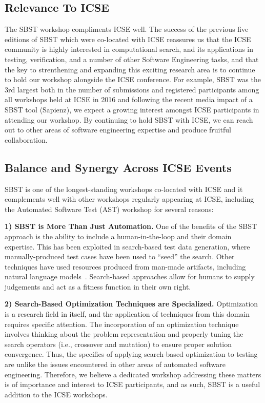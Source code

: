 \documentclass[sigconf,review]{acmart}
\begin{document}
\subsection{Relevance To ICSE}
\label{sec:relevance-icse}

The SBST workshop compliments ICSE well. The success of the previous
five editions of SBST which were co-located with ICSE reassures us
that the ICSE community is highly interested in computational search,
and its applications in testing, verification, and a number of other
Software Engineering tasks, and that the key to strenthening and
expanding this exciting research area is to continue to hold our
workshop alongside the ICSE conference. For example, SBST was the 3rd
largest both in the number of submissions and registered participants
among all workshops held at ICSE in 2016 and following the recent
media impact of a SBST tool (Sapienz), we expect a growing interest
amongst ICSE participants in attending our workshop.  By continuing to
hold SBST with ICSE, we can reach out to other areas of software
engineering expertise and produce fruitful collaboration.


\subsection{Balance and Synergy Across ICSE Events}
\label{sec:balance-icse}

SBST is one of the longest-standing workshops co-located with ICSE and
it complements well with other workshops regularly appearing at ICSE,
including the Automated Software Test (AST) workshop for several
reasons:

{\bf 1) SBST is More Than Just Automation.}  One of the benefits of
the SBST approach is the ability to include a human-in-the-loop and
their domain expertise.  This has been exploited in search-based test
data generation, where manually-produced test cases have been used to
``seed'' the search.  Other techniques have used resources produced
from man-made artifacts, including natural language
models~\cite{Afshan2013}.  Search-based approaches allow for humans to
supply judgements and act as a fitness function in their own
right. %

{\bf 2) Search-Based Optimization Techniques are Specialized.}
Optimization is a research field in itself, and the application of
techniques from this domain requires specific attention.  The
incorporation of an optimization technique involves thinking about the
problem representation and properly tuning the search operators (i.e.,
crossover and mutation) to ensure proper solution convergence.  Thus,
the specifics of applying search-based optimization to testing are
unlike the issues encountered in other areas of automated software
engineering. Therefore, we believe a dedicated workshop addressing
these matters is of importance and interest to ICSE participants, and
as such, SBST is a useful addition to the ICSE workshops.
\end{document}
